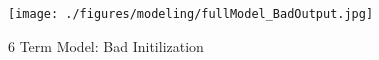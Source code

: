 \begin{figure}[ht!]
\texttt{[image: ./figures/modeling/fullModel\_BadOutput.jpg]}
\centering
\caption{6 Term Model: Bad Initilization}
\label{fig:fullModel_BadOutput}
\end{figure}
